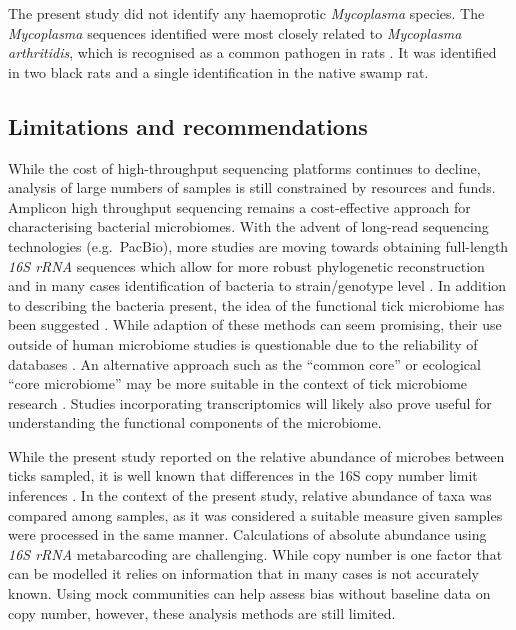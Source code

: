 \documentclass[a4paper, nobind]{templates/ociamthesis}
\begin{document}
The present study did not identify any haemoprotic \emph{Mycoplasma} species. The \emph{Mycoplasma} sequences identified were most closely related to \emph{Mycoplasma arthritidis}, which is recognised as a common pathogen in rats \autocite{dybvigGenomeMycoplasmaArthritidis2008}.
It was identified in two black rats and a single identification in the native swamp rat.

\hypertarget{limitations-and-recommendations}{%
\subsection{Limitations and recommendations}\label{limitations-and-recommendations}}

While the cost of high-throughput sequencing platforms continues to decline, analysis of large numbers of samples is still constrained by resources and funds.
Amplicon high throughput sequencing remains a cost-effective approach for characterising bacterial microbiomes.
With the advent of long-read sequencing technologies (e.g.~PacBio), more studies are moving towards obtaining full-length \emph{16S rRNA} sequences which allow for more robust phylogenetic reconstruction and in many cases identification of bacteria to strain/genotype level \autocite{earlSpecieslevelBacterialCommunity2018,callahanHighthroughputAmpliconSequencing2019}.
In addition to describing the bacteria present, the idea of the functional tick microbiome has been suggested \autocite{estrada-penaTaxonomicVariabilityFunctional2020}.
While adaption of these methods can seem promising, their use outside of human microbiome studies is questionable due to the reliability of databases \autocite{bonnetUpdateIntricateTango2020,sunInferencebasedAccuracyMetagenome2020}.
An alternative approach such as the ``common core'' or ecological ``core microbiome'' may be more suitable in the context of tick microbiome research \autocite{riselyApplyingCoreMicrobiome2020}.
Studies incorporating transcriptomics will likely also prove useful for understanding the functional components of the microbiome.

While the present study reported on the relative abundance of microbes between ticks sampled, it is well known that differences in the 16S copy number limit inferences \autocite{brooksTruthMetagenomicsQuantifying2015,loucaCorrecting16SRRNA2018}.
In the context of the present study, relative abundance of taxa was compared among samples, as it was considered a suitable measure given samples were processed in the same manner.
Calculations of absolute abundance using \emph{16S rRNA} metabarcoding are challenging. While copy number is one factor that can be modelled it relies on information that in many cases is not accurately known.
Using mock communities can help assess bias without baseline data on copy number, however, these analysis methods are still limited.
\end{document}
